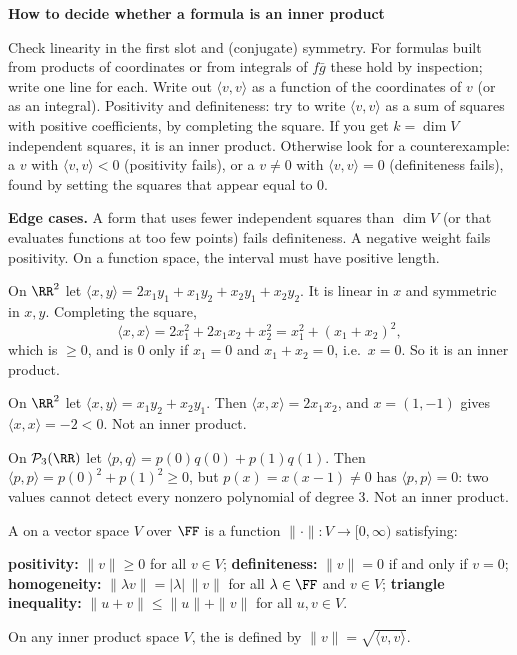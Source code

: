 \documentclass[10pt]{scrartcl}
\newcommand{\ip}[2]{\langle #1,#2\rangle}
\newenvironment{methodbox}[1]{\begin{mdframed}[style=mdbluebox,linecolor=NavyBlue,backgroundcolor=NavyBlue!3]\textbf{\color{NavyBlue}#1}\par\vspace{2pt}}{\end{mdframed}}
\begin{document}
\begin{methodbox}{How to decide whether a formula is an inner product}
\begin{enumerate}[label=\arabic*.,leftmargin=1.5em,itemsep=2pt,topsep=2pt]
  \ii Check linearity in the first slot and (conjugate) symmetry. For formulas built from products of coordinates or from integrals of $f\bar g$ these hold by inspection; write one line for each.
  \ii Write out $\ip vv$ as a function of the coordinates of $v$ (or as an integral).
  \ii Positivity and definiteness: try to write $\ip vv$ as a sum of squares with positive coefficients, by completing the square. If you get $k=\dim V$ independent squares, it is an inner product.
  \ii Otherwise look for a counterexample: a $v$ with $\ip vv<0$ (positivity fails), or a $v\ne0$ with $\ip vv=0$ (definiteness fails), found by setting the squares that appear equal to $0$.
\end{enumerate}
\textbf{Edge cases.} A form that uses fewer independent squares than $\dim V$ (or that evaluates functions at too few points) fails definiteness. A negative weight fails positivity. On a function space, the interval must have positive length.
\end{methodbox}

\begin{example*}
  On $\RR^2$ let $\ip xy=2x_1y_1+x_1y_2+x_2y_1+x_2y_2$. It is linear in $x$ and symmetric in $x,y$. Completing the square,
  \[ \ip xx=2x_1^2+2x_1x_2+x_2^2=x_1^2+(x_1+x_2)^2, \]
  which is $\ge0$, and is $0$ only if $x_1=0$ and $x_1+x_2=0$, i.e.\ $x=0$. So it is an inner product.
\end{example*}

\begin{example*}
  On $\RR^2$ let $\ip xy=x_1y_2+x_2y_1$. Then $\ip xx=2x_1x_2$, and $x=(1,-1)$ gives $\ip xx=-2<0$. Not an inner product.
\end{example*}

\begin{example*}
  On $\PP_3(\RR)$ let $\ip pq=p(0)q(0)+p(1)q(1)$. Then $\ip pp=p(0)^2+p(1)^2\ge0$, but $p(x)=x(x-1)\ne0$ has $\ip pp=0$: two values cannot detect every nonzero polynomial of degree $3$. Not an inner product.
\end{example*}

\begin{definition*}
  A  on a vector space $V$ over $\FF$ is a function $\|\cdot\|\colon V\to[0,\infty)$ satisfying:
  \begin{enumerate}[(i)]
    \ii \textbf{positivity:} $\|v\|\ge 0$ for all $v\in V$;
    \ii \textbf{definiteness:} $\|v\|=0$ if and only if $v=0$;
    \ii \textbf{homogeneity:} $\|\lambda v\|=|\lambda|\,\|v\|$ for all $\lambda\in\FF$ and $v\in V$;
    \ii \textbf{triangle inequality:} $\|u+v\|\le \|u\|+\|v\|$ for all $u,v\in V$.
  \end{enumerate}
  On any inner product space $V$, the  is defined by $\|v\|=\sqrt{\ip vv}$.
\end{definition*}
\end{document}
